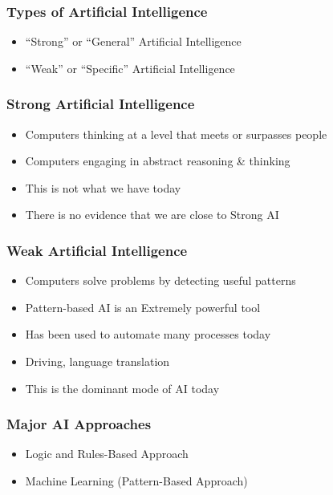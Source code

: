 \begin{frame}[fragile]\frametitle{Types of Artificial Intelligence}
\begin{itemize}
\item  ``Strong'' or ``General'' Artificial Intelligence
\item  ``Weak'' or ``Specific'' Artificial Intelligence
\end{itemize}
\end{frame}

\begin{frame}[fragile]\frametitle{Strong Artificial Intelligence}
\begin{itemize}
\item   Computers thinking at a level that meets or surpasses people
\item   Computers engaging in abstract reasoning \& thinking
\item   This is not what we have today
\item   There is no evidence that we are close to Strong AI
\end{itemize}
\end{frame}

\begin{frame}[fragile]\frametitle{Weak Artificial Intelligence}
\begin{itemize}
\item   Computers solve problems by detecting useful patterns
\item   Pattern-based AI is an Extremely powerful tool 
\item   Has been used to automate many processes today
\item   Driving, language translation
\item   This is the dominant mode of AI today
\end{itemize}
\end{frame}


\begin{frame}[fragile]\frametitle{Major AI Approaches}
\begin{itemize}
\item  Logic and Rules-Based Approach
\item  Machine Learning (Pattern-Based Approach)
\end{itemize}
\end{frame}

